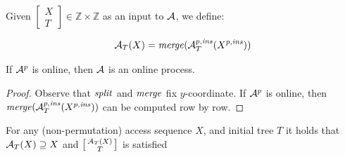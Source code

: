 Given $\left[\begin{smallmatrix}
X\\
T
\end{smallmatrix}\right] \in \mathbb{Z}\times \mathbb{Z}$ as an input to $\cA$, we define:

$$ \cA{}_{T}(X)=\merge(\cA_{T}^{p,\mathit{ins}}(X^{p,\mathit{ins}}))$$


\begin{lemma}
	\label{lem:A' online}If $\cA^{p}$ is online, then $\cA$ is an online
	process.\end{lemma}
\begin{proof}
	Observe that $\Split$ and $\merge$ fix $y$-coordinate. If $\cA^{p}$
	is online, then $\merge(\cA_{T}^{p,\mathit{ins}}(X^{p,\mathit{ins}}))$ can be computed
	row by row.\end{proof}
\begin{lemma}
	\label{lem:A' sat}For any (non-permutation) access sequence $X$,
	and initial tree $T$ it holds that $\cA{}_{T}(X)\supseteq X$ and $\left[\begin{smallmatrix}
	\cA{}_{T}(X)\\
	T
	\end{smallmatrix}\right]$ is satisfied \end{lemma}
